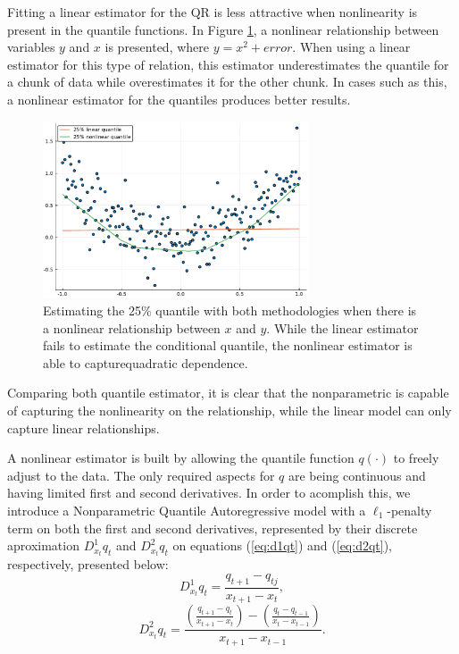 Fitting a linear estimator for the QR is less attractive when nonlinearity is present in the quantile functions. In Figure \ref{fig:nonlinear}, a nonlinear relationship between variables $y$ and $x$ is presented, where $y = x^2 + error$. When using a linear estimator for this type of relation, this estimator underestimates the quantile for a chunk of data while overestimates it for the other chunk. In cases such as this, a nonlinear estimator for the quantiles produces better results.
\begin{figure}[t]
	\begin{center}
	  \includegraphics[width=0.7\textwidth]{Images/nonlinear}
	\end{center}
	\caption{Estimating the 25\% quantile with both methodologies when there is a nonlinear relationship between $x$ and $y$. While the linear estimator fails to estimate the conditional quantile, the nonlinear estimator is able to capturequadratic dependence.}
	\label{fig:nonlinear}
\end{figure}
Comparing both quantile estimator, it is clear that the nonparametric is capable of capturing the nonlinearity on the relationship, while the linear model can only capture linear relationships.

A nonlinear estimator is built by allowing the quantile function $q(\cdot)$ to freely adjust to the data. The only required aspects for $q$ are being continuous and having limited first and second derivatives.
In order to acomplish this, we introduce a Nonparametric Quantile Autoregressive model with a $\ell_{1}$-penalty term on both the first and second derivatives, represented by their discrete aproximation $D^1_{x_t} q_t$ and $D^2_{x_t} q_t$ on equations (\ref{eq:d1qt}) and (\ref{eq:d2qt}), respectively, presented below:
\begin{equation}
  D^{1}_{x_t}q_t=\frac{q_{t+1}-q_{tj}}{x_{t+1}-x_{t}},\label{eq:d1qt}
\end{equation}
\begin{equation}
D_{x_{t}}^{2}q_{t}=\frac{\left(\frac{q_{t+1}-q_{t}}{x_{t+1}-x_{t}}\right)-\left(\frac{q_{t}-q_{t-1}}{x_{t}-x_{t-1}}\right)}{x_{t+1}- x_{t-1}}.\label{eq:d2qt}
\end{equation}


